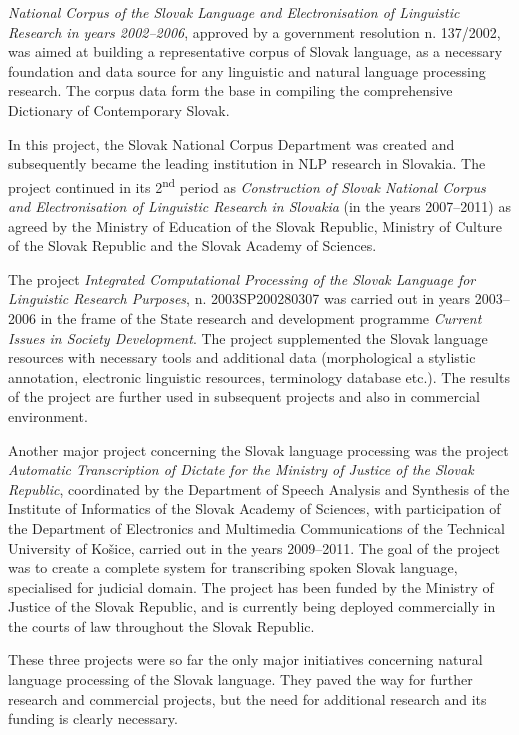 \begin{multicols}{2}
\emph{National Corpus of the Slovak Language and Electronisation of Linguistic
Research in years 2002--2006}, approved by a government resolution n.
137/2002, was aimed at building a representative corpus of Slovak language, as a necessary foundation
and data source for any linguistic and natural language processing research.
The corpus data form the base in compiling the comprehensive Dictionary of
Contemporary Slovak.


In this project, the Slovak National Corpus Department was created and
subsequently became the leading institution in NLP research in Slovakia. The
project continued in its 2\textsuperscript{nd} period as \emph{Construction of Slovak National Corpus and Electronisation of Linguistic Research in Slovakia} (in the years 2007--2011) as agreed by the Ministry of Education of the Slovak Republic, Ministry of Culture of the Slovak Republic and the Slovak Academy of Sciences.


The project \emph{Integrated Computational Processing of the Slovak Language for Linguistic
Research Purposes}, n. 2003SP200280307 was carried out in years 2003--2006 in the frame of the State research and development programme \emph{Current Issues in Society Development}. The project supplemented the Slovak language resources with necessary tools and additional data (morphological a stylistic annotation, electronic linguistic resources, terminology database etc.). The results of the project are further used in subsequent projects and also in commercial environment.


Another major project concerning the Slovak language processing was the project
\emph{Automatic Transcription of Dictate for the Ministry of Justice of
the Slovak Republic},  coordinated by the Department of Speech Analysis
and Synthesis of the Institute of Informatics of the Slovak Academy of
Sciences, with participation of the Department of Electronics and
Multimedia Communications of the Technical University of Košice,
carried out in the years 2009--2011. The goal of the project was to
create a complete system for transcribing spoken Slovak language,
specialised for judicial domain. The project has been funded by the
Ministry of Justice of the Slovak Republic, and is currently being
deployed commercially in the courts of law throughout the Slovak
Republic.

These three projects were so far the only major initiatives concerning natural
language processing of the Slovak language. They paved the way for further
research and commercial projects, but the need for additional research and its funding is clearly necessary.


\end{multicols}
